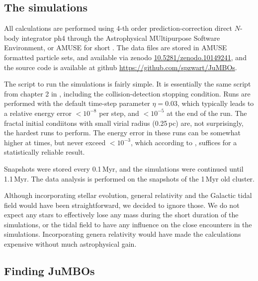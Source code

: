 \documentclass[submission,phys]{lib/SciPost}
\newcommand{\jumbos}{\mbox{JuMBOs}}
\begin{document}
\subsection{The simulations}

All calculations are performed using 4-th order prediction-correction
direct $N$-body integrator {\sc ph4} \cite{2022A&A...659A..86P}
through the Astrophysical MUltipurpose Software Environment, or AMUSE
for short
\cite{2013CoPhC.183..456P,2013AA...557A..84P,2018araa.book.....P}.
The data files are stored in {\sc AMUSE} formatted particle sets, and
available via zenodo \url{10.5281/zenodo.10149241}, and the source
code is available at github \url{https://github.com/spzwart/JuMBOs}.

The script to run the simulations is fairly simple.  It is essentially
the same script from chapter 2 in \cite{2018araa.book.....P},
including the collision-detection stopping condition.  Runs are
performed with the default time-step parameter $\eta=0.03$, which
typically leads to a relative energy error $<10^{-8}$ per step, and
$<10^{-5}$ at the end of the run. The fractal initial condiitons with
small virial radius (0.25\,pc) are, not surprisingly, the hardest runs
to perform. The energy error in these runs can be somewhat higher at
times, but never exceed $<10^{-3}$, which according to
\cite{2041-8205-785-1-L3}, suffices for a statistically reliable
result.

Snapshots were stored every 0.1\,Myr, and the simulations were
continued until 1.1\,Myr. The data analysis is performed on the
snapshots of the 1\,Myr old cluster.

Although incorporating stellar evolution, general relativity and the
Galactic tidal field would have been straightforward, we decided to
ignore those.  We do not expect any stars to effectively lose any mass
during the short duration of the simulations, or the tidal field to
have any influence on the close encounters in the simulations.
Incorporating genera relativity would have made the calculations
expensive without much astrophysical gain.

\subsection{Finding \jumbos}
\end{document}

